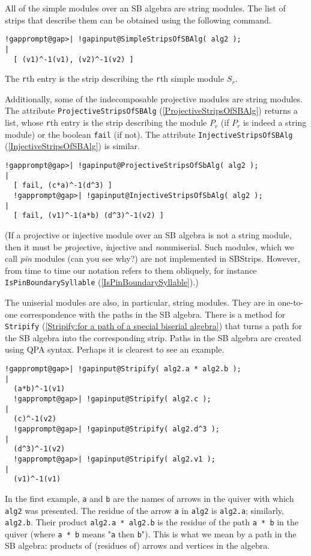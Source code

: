 \documentclass[a4paper,11pt]{report}
\begin{document}
{{ All of the simple modules over an SB algebra are string modules. The list of
strips that describe them can be obtained using the following command. 
\begin{Verbatim}[commandchars=!@|,fontsize=\small,frame=single,label=Example]
  !gapprompt@gap>| !gapinput@SimpleStripsOfSBAlg( alg2 );
|
  [ (v1)^-1(v1), (v2)^-1(v2) ]
\end{Verbatim}
 The \texttt{r}th entry is the strip describing the \texttt{r}th simple module $S_r$. 

 Additionally, some of the indecomposable projective modules are string
modules. The attribute \texttt{ProjectiveStripsOfSBAlg} (\ref{ProjectiveStripsOfSBAlg}) returns a list, whose \texttt{r}th entry is the strip describing the module $P_r$ (if $P_r$ is indeed a string module) or the boolean \texttt{fail} (if not). The attribute \texttt{InjectiveStripsOfSBAlg} (\ref{InjectiveStripsOfSBAlg}) is similar. 
\begin{Verbatim}[commandchars=!@|,fontsize=\small,frame=single,label=Example]
  !gapprompt@gap>| !gapinput@ProjectiveStripsOfSbAlg( alg2 );
|
  [ fail, (c*a)^-1(d^3) ]
  !gapprompt@gap>| !gapinput@InjectiveStripsOfSbAlg( alg2 );
|
  [ fail, (v1)^-1(a*b) (d^3)^-1(v2) ]
\end{Verbatim}
 (If a projective or injective module over an SB algebra is not a string
module, then it must be \emph{p}rojective, \emph{i}njective and \emph{n}onuniserial. Such modules, which we call \emph{pin} modules (can you see why?) are not implemented in \textsf{SBStrips}. However, from time to time our notation refers to them obliquely, for
instance \texttt{IsPinBoundarySyllable} (\ref{IsPinBoundarySyllable}).) 

 The uniserial modules are also, in particular, string modules. They are in
one-to-one correspondence with the paths in the SB algebra. There is a method
for \texttt{Stripify} (\ref{Stripify:for a path of a special biserial algebra}) that turns a path for the SB algebra into the corresponding strip. Paths in
the SB algebra are created using \textsf{QPA} syntax. Perhaps it is clearest to see an example. 
\begin{Verbatim}[commandchars=!@|,fontsize=\small,frame=single,label=Example]
  !gapprompt@gap>| !gapinput@Stripify( alg2.a * alg2.b );
|
  (a*b)^-1(v1)
  !gapprompt@gap>| !gapinput@Stripify( alg2.c );
|
  (c)^-1(v2)
  !gapprompt@gap>| !gapinput@Stripify( alg2.d^3 );
|
  (d^3)^-1(v2)
  !gapprompt@gap>| !gapinput@Stripify( alg2.v1 );
|
  (v1)^-1(v1)
\end{Verbatim}
 In the first example, \texttt{a} and \texttt{b} are the names of arrows in the quiver with which \texttt{alg2} was presented. The residue of the arrow \texttt{a} in \texttt{alg2} is \texttt{alg2.a}; similarly, \texttt{alg2.b}. Their product \texttt{alg2.a * alg2.b} is the residue of the path \texttt{a * b} in the quiver (where \texttt{a * b} means "\texttt{a} then \texttt{b}"). This is what we mean by a path in the SB algebra: products of (residues
of) arrows and vertices in the algebra. 

}}
\end{document}
